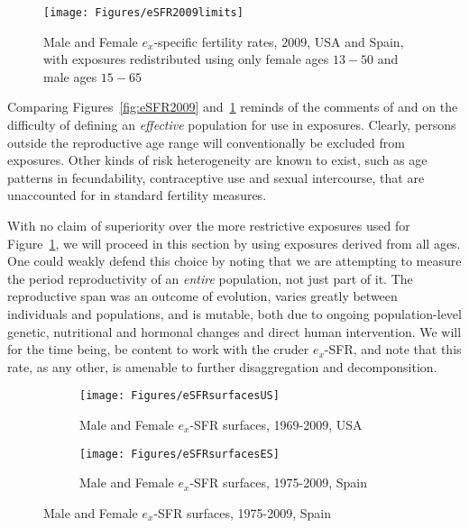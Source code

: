 \begin{figure}[ht!]
        \centering  
          \caption{Male and Female $e_x$-specific fertility rates, 2009, USA and
          Spain, with exposures redistributed using only female ages $13-50$ and
          male ages $15-65$}
          \texttt{[image: Figures/eSFR2009limits]}
          \label{fig:eSFR2009limits}
\end{figure}

Comparing Figures~\ref{fig:eSFR2009} and~\ref{fig:eSFR2009limits} reminds of the
comments of \citet{gupta1978alternative} and \citet{mitra1976effect} on the difficulty of
defining an \textit{effective} population for use in exposures. Clearly, persons
outside the reproductive age range will conventionally be excluded from
exposures. Other kinds of risk heterogeneity are known to exist, such as age
patterns in fecundability, contraceptive use and sexual intercourse, that are
unaccounted for in standard fertility measures. 

With no claim of superiority over the more
restrictive exposures used for Figure~\ref{fig:eSFR2009limits}, we will proceed
in this section by using exposures derived from all ages. One could weakly
defend this choice by noting that we are attempting to measure the period
reproductivity of an \textit{entire} population, not just part of it. The
reproductive span was an outcome of evolution, varies greatly between
individuals and populations, and is mutable, both due to ongoing
population-level genetic, nutritional and hormonal changes and direct human
intervention. We will for the time being, be content to work with the cruder $e_x$-SFR, and note
that this rate, as any other, is amenable to further disaggregation and
decomponsition.

\begin{figure}
        \centering
        \begin{subfigure}
                \centering
                \caption{Male and Female $e_x$-SFR surfaces, 1969-2009, USA}
                \texttt{[image: Figures/eSFRsurfacesUS]}
                \label{fig:exSFRsurfUS}
        \end{subfigure}
        \begin{subfigure}
                \centering
                \caption{Male and Female $e_x$-SFR surfaces, 1975-2009, Spain}
                \texttt{[image: Figures/eSFRsurfacesES]} 
                \label{fig:exSFRsurfES}
        \end{subfigure}
\end{figure}

